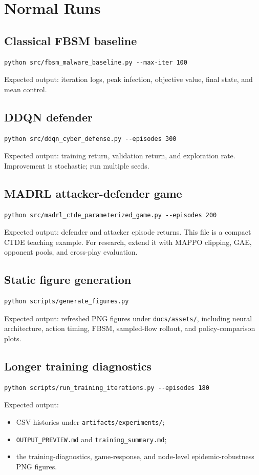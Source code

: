 \documentclass[11pt,a4paper]{article}
\begin{document}
\section{Normal Runs}
\subsection{Classical FBSM baseline}
\begin{lstlisting}[style=pythonstyle]
python src/fbsm_malware_baseline.py --max-iter 100
\end{lstlisting}
Expected output: iteration logs, peak infection, objective value, final state, and mean control.

\subsection{DDQN defender}
\begin{lstlisting}[style=pythonstyle]
python src/ddqn_cyber_defense.py --episodes 300
\end{lstlisting}
Expected output: training return, validation return, and exploration rate. Improvement is stochastic; run multiple seeds.

\subsection{MADRL attacker-defender game}
\begin{lstlisting}[style=pythonstyle]
python src/madrl_ctde_parameterized_game.py --episodes 200
\end{lstlisting}
Expected output: defender and attacker episode returns. This file is a compact CTDE teaching example. For research, extend it with MAPPO clipping, GAE, opponent pools, and cross-play evaluation.

\subsection{Static figure generation}
\begin{lstlisting}[style=pythonstyle]
python scripts/generate_figures.py
\end{lstlisting}
Expected output: refreshed PNG figures under \texttt{docs/assets/}, including neural architecture, action timing, FBSM, sampled-flow rollout, and policy-comparison plots.

\subsection{Longer training diagnostics}
\begin{lstlisting}[style=pythonstyle]
python scripts/run_training_iterations.py --episodes 180
\end{lstlisting}
Expected output:
\begin{itemize}
\item CSV histories under \texttt{artifacts/experiments/};
\item \texttt{OUTPUT\_PREVIEW.md} and \texttt{training\_summary.md};
\item the training-diagnostics, game-response, and node-level epidemic-robustness PNG figures.
\end{itemize}
\end{document}
